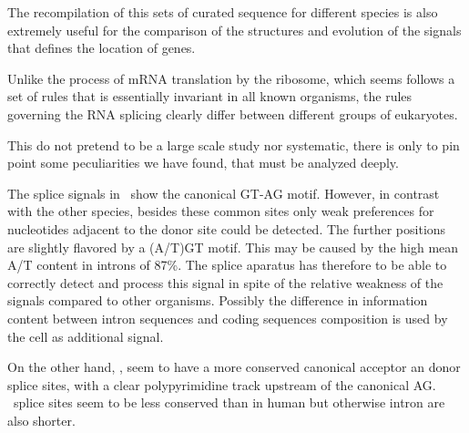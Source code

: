 The recompilation of this sets of curated sequence for different
species is also extremely useful for the comparison of the structures
and evolution of the signals that defines the location of genes.

Unlike the process of mRNA translation by the ribosome, which seems
follows a set of rules that is essentially invariant in all known
organisms, the rules governing the RNA splicing clearly differ between
different groups of eukaryotes.  


This do not pretend to be a large scale study nor systematic, there is
only to pin point some peculiarities we have found, that must be
analyzed deeply.

The splice signals in \Dd\ show the canonical GT-AG motif. However,
in contrast with the other species, besides these common sites only
weak preferences for nucleotides adjacent to the donor site could be
detected. The further positions are slightly flavored by a (A/T)GT
motif. This may be caused by the high mean A/T content in introns of
87\%. The splice aparatus has therefore to be able to correctly detect
and process this signal in spite of the relative weakness of the
signals compared to other organisms. Possibly the difference in
information content between intron sequences and coding sequences
composition is used by the cell as additional signal.

On the other hand, \Dm, seem to have a more conserved canonical
acceptor an donor splice sites, with a clear polypyrimidine track
upstream of the canonical AG. \Tn\ splice sites seem to be less
conserved than in human but otherwise intron are also shorter.



